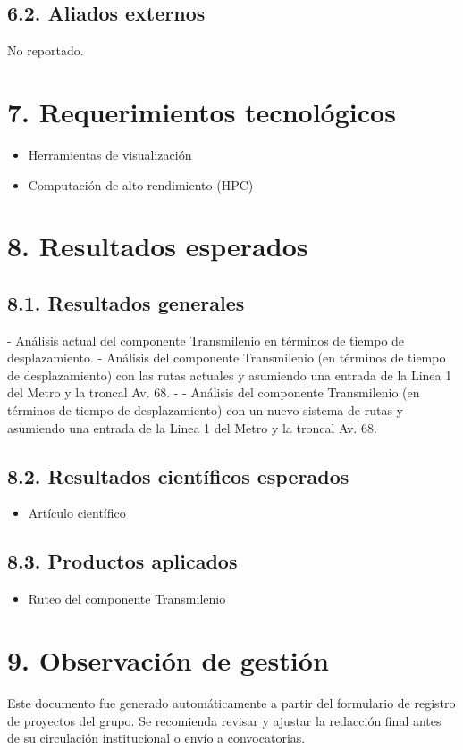 \documentclass[a4paper,12pt]{article}
\begin{document}
\subsection*{6.2. Aliados externos}
No reportado.

\section*{7. Requerimientos tecnológicos}
\begin{itemize}
    \item Herramientas de visualización
    \item Computación de alto rendimiento (HPC)
\end{itemize}

\section*{8. Resultados esperados}
\subsection*{8.1. Resultados generales}
- Análisis actual del componente Transmilenio en términos de tiempo de desplazamiento. - Análisis del componente Transmilenio (en términos de tiempo de desplazamiento) con las rutas actuales y asumiendo una entrada de la Linea 1 del Metro y la troncal Av. 68. - - Análisis del componente Transmilenio (en términos de tiempo de desplazamiento) con un nuevo sistema de rutas y asumiendo una entrada de la Linea 1 del Metro y la troncal Av. 68.

\subsection*{8.2. Resultados científicos esperados}
\begin{itemize}
    \item Artículo científico
\end{itemize}

\subsection*{8.3. Productos aplicados}
\begin{itemize}
    \item Ruteo del componente Transmilenio
\end{itemize}

\section*{9. Observación de gestión}
Este documento fue generado automáticamente a partir del formulario de registro de proyectos del grupo. Se recomienda revisar y ajustar la redacción final antes de su circulación institucional o envío a convocatorias.
\end{document}
